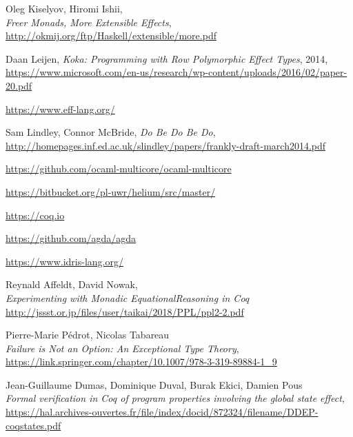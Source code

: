 \documentclass[declaration,inz,english,shortabstract]{iithesis}
\begin{document}
\begin{thebibliography}{1}
        Oleg Kiselyov, Hiromi Ishii, \\
        \textit{Freer Monads, More Extensible Effects}, \\
        \url{http://okmij.org/ftp/Haskell/extensible/more.pdf}

        Daan Leijen,
        \textit{Koka: Programming with Row Polymorphic Effect Types}, 2014, \\
        \url{https://www.microsoft.com/en-us/research/wp-content/uploads/2016/02/paper-20.pdf}

        \url{https://www.eff-lang.org/}

        Sam Lindley, Connor McBride, \textit{Do Be Do Be Do}, \\
        \url{http://homepages.inf.ed.ac.uk/slindley/papers/frankly-draft-march2014.pdf}

        \url{https://github.com/ocaml-multicore/ocaml-multicore}
        
        \url{https://bitbucket.org/pl-uwr/helium/src/master/}

        \url{https://coq.io}

        \url{https://github.com/agda/agda}

        \url{https://www.idris-lang.org/}

        Reynald Affeldt, David Nowak, \\
        \textit{Experimenting with Monadic EquationalReasoning in Coq} \\
        \url{http://jssst.or.jp/files/user/taikai/2018/PPL/ppl2-2.pdf}

        Pierre-Marie Pédrot, Nicolas Tabareau \\
        \textit{Failure is Not an Option: An Exceptional Type Theory}, \\
        \url{https://link.springer.com/chapter/10.1007/978-3-319-89884-1_9}

        Jean-Guillaume Dumas, Dominique Duval, Burak Ekici, Damien Pous \\
        \textit{Formal verification in Coq of program properties involving the global state effect}, \\
        \url{https://hal.archives-ouvertes.fr/file/index/docid/872324/filename/DDEP-coqstates.pdf}


\end{thebibliography}
\end{document}
